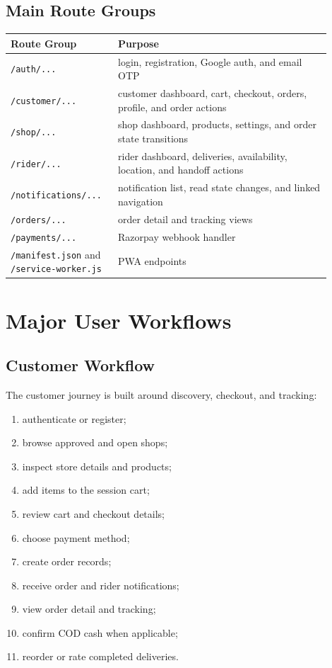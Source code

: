 \documentclass[12pt,a4paper]{article}
\begin{document}
\subsection{Main Route Groups}
\begin{longtable}{|p{0.28\linewidth}|p{0.62\linewidth}|}
\hline
\textbf{Route Group} & \textbf{Purpose} \\
\hline
\texttt{/auth/...} & login, registration, Google auth, and email OTP \\
\hline
\texttt{/customer/...} & customer dashboard, cart, checkout, orders, profile, and order actions \\
\hline
\texttt{/shop/...} & shop dashboard, products, settings, and order state transitions \\
\hline
\texttt{/rider/...} & rider dashboard, deliveries, availability, location, and handoff actions \\
\hline
\texttt{/notifications/...} & notification list, read state changes, and linked navigation \\
\hline
\texttt{/orders/...} & order detail and tracking views \\
\hline
\texttt{/payments/...} & Razorpay webhook handler \\
\hline
\texttt{/manifest.json} and \texttt{/service-worker.js} & PWA endpoints \\
\hline
\end{longtable}

\section{Major User Workflows}
\subsection{Customer Workflow}
The customer journey is built around discovery, checkout, and tracking:
\begin{enumerate}[leftmargin=1.5em]
    \item authenticate or register;
    \item browse approved and open shops;
    \item inspect store details and products;
    \item add items to the session cart;
    \item review cart and checkout details;
    \item choose payment method;
    \item create order records;
    \item receive order and rider notifications;
    \item view order detail and tracking;
    \item confirm COD cash when applicable;
    \item reorder or rate completed deliveries.
\end{enumerate}
\end{document}
